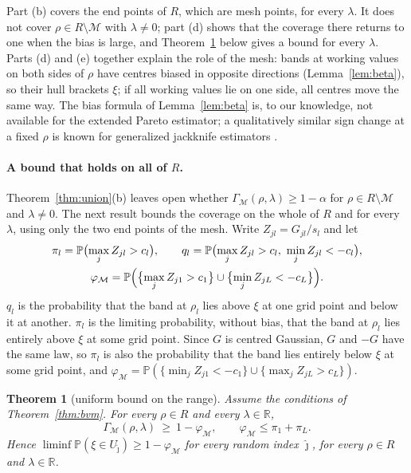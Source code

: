 \documentclass[11pt]{article}
\newtheorem{theorem}{Theorem}
\theoremstyle{definition}
\theoremstyle{remark}
\numberwithin{equation}{section}
\newcommand{\R}{\mathbb{R}}
\newcommand{\Prob}{\mathbb{P}}
\newcommand{\Mesh}{\mathcal{M}}
\begin{document}
Part (b) covers the end points of $R$, which are mesh points, for every $\lambda$. It does not cover $\rho\in R\setminus\Mesh$ with $\lambda\neq0$; part (d) shows that the coverage there returns to one when the bias is large, and Theorem~\ref{thm:uniform} below gives a bound for every $\lambda$. Parts (d) and (e) together explain the role of the mesh: bands at working values on both sides of $\rho$ have centres biased in opposite directions (Lemma~\ref{lem:beta}), so their hull brackets $\xi$; if all working values lie on one side, all centres move the same way. The bias formula of Lemma~\ref{lem:beta} is, to our knowledge, not available for the extended Pareto estimator; a qualitatively similar sign change at a fixed $\rho$ is known for generalized jackknife estimators \citep{gomesmartinsneves2002}.

\paragraph{A bound that holds on all of $R$.} Theorem~\ref{thm:union}(b) leaves open whether $\Gamma_\Mesh(\rho,\lambda)\ge1-\alpha$ for $\rho\in R\setminus\Mesh$ and $\lambda\ne0$. The next result bounds the coverage on the whole of $R$ and for every $\lambda$, using only the two end points of the mesh. Write $Z_{jl}=G_{jl}/s_l$ and let
\begin{gather*}
\pi_l=\Prob\bigl(\max_jZ_{jl}>c_l\bigr),\qquad q_l=\Prob\bigl(\max_jZ_{jl}>c_l,\ \min_jZ_{jl}<-c_l\bigr),\\
\varphi_\Mesh=\Prob\Bigl(\bigl\{\max_jZ_{j1}>c_1\bigr\}\cup\bigl\{\min_jZ_{jL}<-c_L\bigr\}\Bigr).
\end{gather*}
$q_l$ is the probability that the band at $\rho_l$ lies above $\xi$ at one grid point and below it at another. $\pi_l$ is the limiting probability, without bias, that the band at $\rho_l$ lies entirely above $\xi$ at some grid point. Since $G$ is centred Gaussian, $G$ and $-G$ have the same law, so $\pi_l$ is also the probability that the band lies entirely below $\xi$ at some grid point, and $\varphi_\Mesh=\Prob(\{\min_jZ_{j1}<-c_1\}\cup\{\max_jZ_{jL}>c_L\})$.

\begin{theorem}[uniform bound on the range]\label{thm:uniform}
Assume the conditions of Theorem~\ref{thm:bvm}. For every $\rho\in R$ and every $\lambda\in\R$,
\[
\Gamma_\Mesh(\rho,\lambda)\ \ge\ 1-\varphi_\Mesh,\qquad \varphi_\Mesh\le\pi_1+\pi_L .
\]
Hence $\liminf\Prob(\xi\in U_{\hat\jmath})\ge1-\varphi_\Mesh$ for every random index $\hat\jmath$, for every $\rho\in R$ and $\lambda\in\R$.
\end{theorem}
\end{document}

